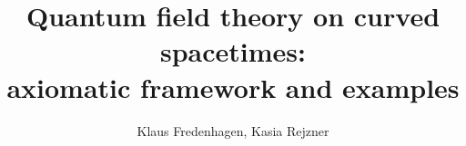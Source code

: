 \documentclass[11pt]{article}
\newcommand{\1}{\mathds{1}}                         %
\begin{document}
\title{Quantum field theory on curved spacetimes:\\ axiomatic framework and examples}
\author{Klaus Fredenhagen, Kasia Rejzner}
\maketitle
 \theoremstyle{plain}
  \newtheorem{df}{Definition}[section]
  \newtheorem{thm}[df]{Theorem}
  \newtheorem{prop}[df]{Proposition}
  \newtheorem{cor}[df]{Corollary}
  \newtheorem{lemma}[df]{Lemma}
    \newtheorem{exa}[df]{Example}
\end{document}
